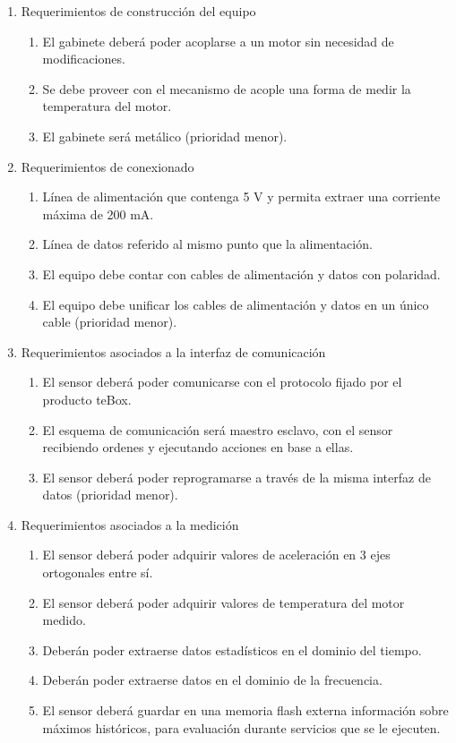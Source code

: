 \documentclass[11pt]{charter}
\begin{document}
\begin{enumerate}
\item Requerimientos de construcción del equipo
	\begin{enumerate}
	\item El gabinete deberá poder acoplarse a un motor sin necesidad de modificaciones.
	\item Se debe proveer con el mecanismo de acople una forma de medir la temperatura del motor.
	\item El gabinete será metálico (prioridad menor).
	\end{enumerate}
\item Requerimientos de conexionado
	\begin{enumerate}
	\item Línea de alimentación que contenga 5 V y permita extraer una corriente máxima de 200 mA.
	\item Línea de datos referido al mismo punto que la alimentación.
	\item El equipo debe contar con cables de alimentación y datos con polaridad.
	\item El equipo debe unificar los cables de alimentación y datos en un único cable
	 (prioridad menor).
	\end{enumerate}
\item Requerimientos asociados a la interfaz de comunicación
	\begin{enumerate}
	\item El sensor deberá poder comunicarse con el protocolo fijado por el producto teBox.
	\item El esquema de comunicación será maestro esclavo, con el sensor recibiendo ordenes y ejecutando acciones en base a ellas.
	\item El sensor deberá poder reprogramarse a través de la misma interfaz de datos (prioridad menor).
	\end{enumerate}
\item Requerimientos asociados a la medición
	\begin{enumerate}
	\item El sensor deberá poder adquirir valores de aceleración en 3 ejes ortogonales entre sí.
	\item El sensor deberá poder adquirir valores de temperatura del motor medido.
	\item Deberán poder extraerse datos estadísticos en el dominio del tiempo.
	\item Deberán poder extraerse datos en el dominio de la frecuencia.
	\item El sensor deberá guardar en una memoria flash externa información sobre máximos históricos, para evaluación durante servicios que se le ejecuten.

\end{enumerate}
\end{enumerate}
\end{document}

